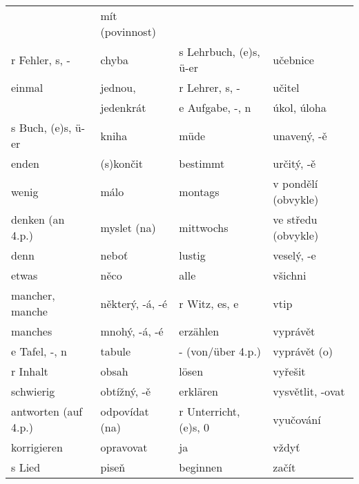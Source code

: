 \begin{table}[ht!]
\begin{tabular}{llll}
                                                    & mít {\scriptsize (povinnost)}               \\
          r Fehler, s, -       & chyba              & s Lehrbuch, (e)s, ü-er  & učebnice          \\
          einmal               & jednou,            & r Lehrer, s, -   & učitel                   \\
                               & jedenkrát          & e Aufgabe, -, n  & úkol, úloha              \\
          s Buch, (e)s, ü-er   & kniha              & müde             & unavený, -ě              \\
          enden                & (s)končit          & bestimmt         & určitý, -ě               \\
          wenig                & málo               & montags        
                                                    & v pondělí {\scriptsize (obvykle)}           \\
          denken (an 4.p.)     & myslet (na)        & mittwochs      
                                                    & ve středu {\scriptsize (obvykle)}           \\
          denn                 & neboť              & lustig           & veselý, -e               \\
          etwas                & něco               & alle             & všichni                  \\
          mancher, manche      & některý, -á, -é    & r Witz, es, e    & vtip                     \\
          manches              & mnohý, -á, -é      & erzählen         & vyprávět                 \\
          e Tafel, -, n        & tabule             &  - (von/über 4.p.)  & vyprávět (o)          \\
          r Inhalt             & obsah              & lösen            & vyřešit                  \\
          schwierig            & obtížný, -ě        & erklären         & vysvětlit, -ovat         \\
          antworten {\scriptsize (auf 4.p.)} 
                               & odpovídat (na)     & r Unterricht, (e)s, 0  & vyučování          \\
          korrigieren          & opravovat          & ja               & vždyť                    \\
          s Lied               & piseň              & beginnen         & začít                    \\

\end{tabular}
\end{table}
